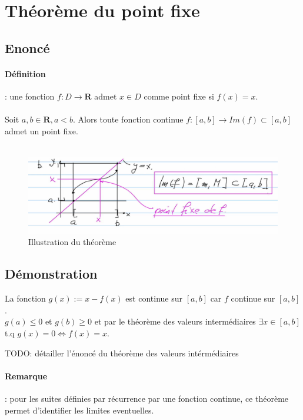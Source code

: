 \documentclass{article}
\begin{document}
\newpage

\section{Théorème du point fixe}

\subsection{Enoncé}

\paragraph{Définition} : une fonction $ f : D \to \mathbf{R} $ admet $ x \in D $ comme point fixe si $ f(x) = x $.\\\\
Soit $ a, b \in \mathbf{R}, a < b $. Alors toute fonction continue $ f : [a, b] \to Im(f) \subset [a, b] $ admet un point fixe.\\\\

\begin{figure}[htp]
    \centering
    \includegraphics[width=12cm]{Images/pointfixe.png}
    \caption{Illustration du théorème}
    \label{fig:complex}
\end{figure} 

\subsection{Démonstration}

La fonction $ g(x) := x - f(x) $ est continue sur $ [a, b] $ car $ f $ continue sur $ [a, b] $.\\
$ g(a) \leq 0 $ et $ g(b) \geq 0 $ et par le théorème des valeurs intermédiaires $ \exists x \in [a, b] $ t.q $ g(x) = 0 \Leftrightarrow f(x) = x $.

TODO: détailler l'énoncé du théorème des valeurs intérmédiaires

\paragraph{Remarque}: pour les suites définies par récurrence par une fonction continue, ce théorème permet d'identifier les limites eventuelles.
\end{document}
